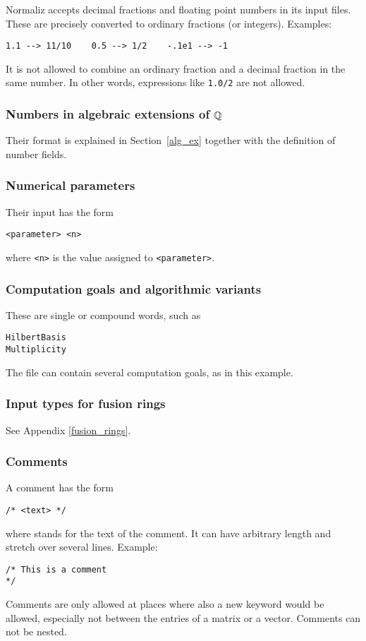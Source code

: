 Normaliz accepts decimal fractions and floating point numbers in its input files. These are precisely converted to ordinary fractions (or integers). Examples:
\begin{Verbatim}
1.1 --> 11/10    0.5 --> 1/2    -.1e1 --> -1
\end{Verbatim}
It is not allowed to combine an ordinary fraction and a decimal fraction in the same number. In other words, expressions like \verb|1.0/2| are not allowed.

\subsubsection{Numbers in algebraic extensions of ${\mathbb Q}$}\label{numberfield_input}

Their format is explained in Section~\ref{alg_ex} together with the definition of number fields.

\subsubsection{Numerical parameters}

Their input has the form
\begin{Verbatim}
<parameter> <n>
\end{Verbatim}
where \verb|<n>| is the value assigned to \verb|<parameter>|.

\subsubsection{Computation goals and algorithmic variants}\label{subsecGoals}

These are single or compound words, such as
\begin{Verbatim}
HilbertBasis
Multiplicity
\end{Verbatim}
The file can contain several computation goals, as in this example.

\subsubsection{Input types for fusion rings}

See Appendix \ref{fusion_rings}.

\subsubsection{Comments}

A comment has the form
\begin{Verbatim}
/* <text> */
\end{Verbatim}
where  stands for the text of the comment. It can have arbitrary length and stretch over several lines. Example:
\begin{Verbatim}
/* This is a comment
*/
\end{Verbatim}
Comments are only allowed at places where also a new keyword would be allowed, especially not between the entries of a matrix or a vector. Comments can not be nested.

